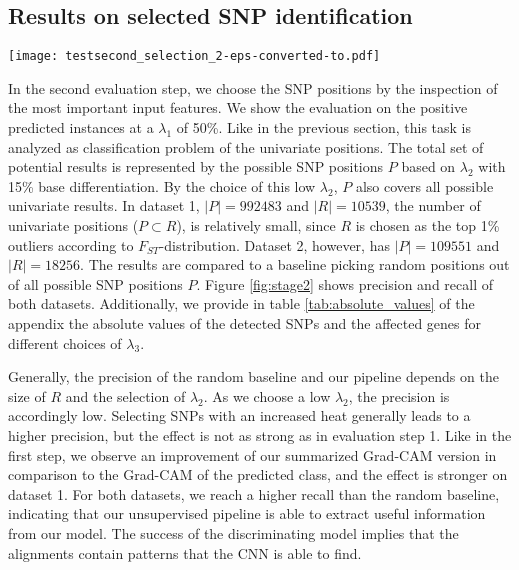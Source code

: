 \documentclass{article}
\begin{document}
\subsection{Results on selected SNP identification}
\begin{figure*}[t]
    \texttt{[image: testsecond\_selection\_2-eps-converted-to.pdf]}
    \caption{The two upper plots show precision and recall of dataset 1 and the lower ones the results of dataset 2 on the SNP calling task. We plotted the measures against the percentage of positive classified instances $\lambda_{3}$. $Pred\_Grad$ selects SNPs based on the Grad-CAM of the predicted class and $Sum\_Grad$ uses equation \ref{eq:heatmap}. }
    \label{fig:stage2}
\end{figure*}
In the second evaluation step, we choose the SNP positions by the inspection of the most important input features. We show the evaluation on the positive predicted instances at a $\lambda_{1}$ of 50\%. 
Like in the previous section, this task is analyzed as classification problem of the univariate positions. The total set of potential results is represented by the possible SNP positions $P$ based on $\lambda_{2}$ with 15\% base differentiation. By the choice of this low  $\lambda_{2}$, $P$ also covers all possible univariate results. In dataset 1, $|P|=992483$ and $|R|=10539$, the number of univariate positions ($P\subset R$), is relatively small,  since $R$ is chosen as the top 1\% outliers according to $F_{ST}$-distribution. %
Dataset 2, however, has $|P|=109551$ and $|R|=18256$. %
The results are compared to a baseline picking random positions out of all possible SNP positions $P$. %
Figure \ref{fig:stage2} shows precision and recall of both datasets. Additionally, we provide in table \ref{tab:absolute_values} of the appendix the absolute values of the detected SNPs and the affected genes for different choices of $\lambda_{3}$. 

Generally, the precision of the random baseline and our pipeline depends on the size of $R$ and the selection of $\lambda_{2}$. As we choose a low $\lambda_{2}$, the precision is accordingly low. Selecting SNPs with an increased heat generally leads to a higher precision, but the effect is not as strong as in evaluation step 1. 
Like in the first step, we observe an improvement of our summarized Grad-CAM version in comparison to the Grad-CAM of the predicted class, and the effect is stronger on dataset 1.
For both datasets, we reach a higher recall than the random baseline, indicating that our unsupervised pipeline is able to extract useful information from our model. 
The success of the discriminating model implies that the alignments contain patterns that the CNN is able to find.
\end{document}
